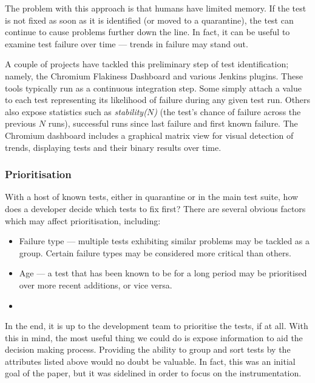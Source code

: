 The problem with this approach is that humans have limited memory. If the \flaky
test is not fixed as soon as it is identified (or moved to a quarantine), the
test can continue to cause problems further down the line. In fact, it can be
useful to examine test failure over time --- trends in failure may stand out.

A couple of projects have tackled this preliminary step of \flaky test
identification; namely, the Chromium Flakiness
Dashboard\cite{flakinessDashboard} and various Jenkins plugins. These tools
typically run as a continuous integration step. Some simply attach a value to
each test representing its likelihood of failure during any given test run.
Others also expose statistics such as \emph{stability($N$)} (the test's chance
of failure across the previous $N$ runs), successful runs since last failure and
first known failure. The Chromium dashboard includes a graphical matrix view for
visual detection of trends, displaying tests and their binary results over time.

\subsubsection{Prioritisation}

With a host of known \flaky tests, either in quarantine or in the main test
suite, how does a developer decide which tests to fix first? There are several
obvious factors which may affect prioritisation, including:
\begin{itemize}
	\item Failure type --- multiple \flaky tests exhibiting similar problems may
	be tackled as a group. Certain failure types may be considered more critical than others.
	\item Age --- a \flaky test that has been known to be \flaky for a long period
	may be prioritised over more recent additions, or vice versa.
	\item {}
\end{itemize}

In the end, it is up to the development team to prioritise the \flaky tests, if
at all. With this in mind, the most useful thing we could do is expose
information to aid the decision making process. Providing the ability to group
and sort \flaky tests by the attributes listed above would no doubt be valuable.
In fact, this was an initial goal of the paper, but it was sidelined in order to
focus on the instrumentation.

